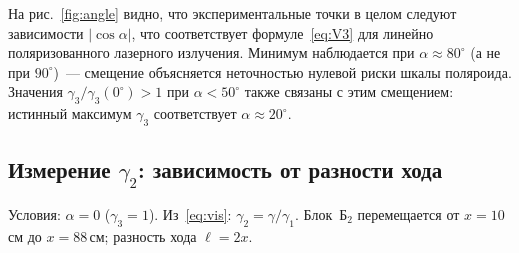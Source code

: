 \documentclass[twoside]{mfitjournal}
\begin{document}
На рис.~\ref{fig:angle} видно, что экспериментальные точки в целом следуют зависимости $|\cos\alpha|$, что соответствует формуле~\eqref{eq:V3} для линейно поляризованного лазерного излучения. Минимум наблюдается при $\alpha \approx 80^\circ$ (а не при $90^\circ$)~--- смещение объясняется неточностью нулевой риски шкалы поляроида. Значения $\gamma_3/\gamma_3(0^\circ) > 1$ при $\alpha < 50^\circ$ также связаны с этим смещением: истинный максимум $\gamma_3$ соответствует $\alpha \approx 20^\circ$.

\subsection*{Измерение \texorpdfstring{$\gamma_2$}{gamma2}: зависимость от разности хода}

Условия: $\alpha = 0$ ($\gamma_3 = 1$). Из~\eqref{eq:vis}: $\gamma_2 = \gamma/\gamma_1$.
Блок~Б$_2$ перемещается от $x = 10$\,см до $x = 88$\,см; разность хода $\ell = 2x$.
\end{document}
